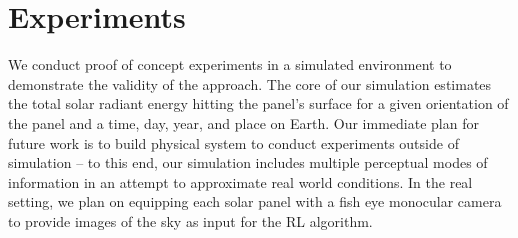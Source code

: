 \documentclass[11pt]{article}
\begin{document}


\section{Experiments}

We conduct proof of concept experiments in a simulated environment to demonstrate the validity of the approach. The core of our simulation estimates the total solar radiant energy hitting the panel's surface for a given orientation of the panel and a time, day, year, and place on Earth. Our immediate plan for future work is to build physical system to conduct experiments outside of simulation -- to this end, our simulation includes multiple perceptual modes of information in an attempt to approximate real world conditions. In the real setting, we plan on equipping each solar panel with a fish eye monocular camera to provide images of the sky as input for the RL algorithm.%
\end{document}
